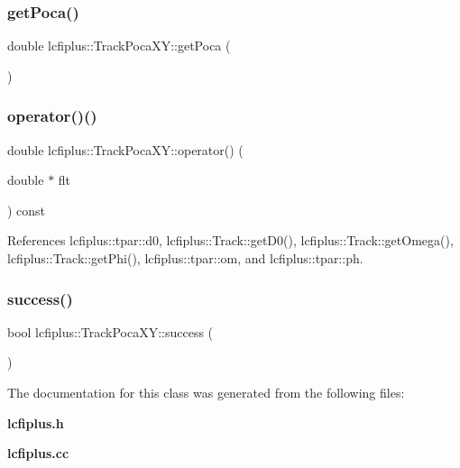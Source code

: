 \subsubsection{get\+Poca()}
{\footnotesize\ttfamily double lcfiplus\+::\+Track\+Poca\+X\+Y\+::get\+Poca (\begin{DoxyParamCaption}{ }\end{DoxyParamCaption})\hspace{0.3cm}{\ttfamily [inline]}}

\mbox{\label{classlcfiplus_1_1TrackPocaXY_a3f8d1394b037f58f84db861f17a1cfac}} 
\subsubsection{operator()()}
{\footnotesize\ttfamily double lcfiplus\+::\+Track\+Poca\+X\+Y\+::operator() (\begin{DoxyParamCaption}\item[{double $\ast$}]{flt }\end{DoxyParamCaption}) const}



References lcfiplus\+::tpar\+::d0, lcfiplus\+::\+Track\+::get\+D0(), lcfiplus\+::\+Track\+::get\+Omega(), lcfiplus\+::\+Track\+::get\+Phi(), lcfiplus\+::tpar\+::om, and lcfiplus\+::tpar\+::ph.

\mbox{\label{classlcfiplus_1_1TrackPocaXY_acaab013c909576c46b2043b407266ef0}} 
\subsubsection{success()}
{\footnotesize\ttfamily bool lcfiplus\+::\+Track\+Poca\+X\+Y\+::success (\begin{DoxyParamCaption}{ }\end{DoxyParamCaption})\hspace{0.3cm}{\ttfamily [inline]}}



The documentation for this class was generated from the following files\+:\begin{DoxyCompactItemize}
\item 
\textbf{ lcfiplus.\+h}\item 
\textbf{ lcfiplus.\+cc}\end{DoxyCompactItemize}
